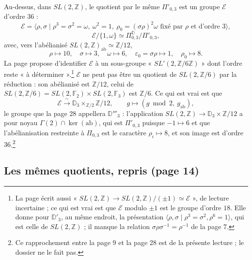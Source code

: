 \documentclass[11pt,a4paper]{article}
\begin{document}
Au-dessus, dans $SL(2, \mathbb{Z})$, le quotient par le même $\Pi'_{0,3}$ est un
groupe $\mathcal{E}$ d'ordre $36$ :
\[
\mathcal{E} = \langle \rho, \sigma \mid \rho^3 = \sigma^2 = \omega,\ \omega^2 = 1,\
\rho_0 = (\sigma\rho)^2\omega \text{ fixé par } \rho \text{ et d'ordre } 3 \rangle,
\]
\[
\mathcal{E}/\{1, \omega\} \simeq \Pi^{\mathbb{D}}_{0,3}/\Pi'_{0,3} ,
\]
avec, vers l'abélianisé $SL(2, \mathbb{Z})_{\mathrm{ab}} \simeq \mathbb{Z}/12$,
\[
\rho \mapsto 10, \quad \sigma \mapsto 3, \quad \omega \mapsto 6, \quad
\varepsilon_0 = \sigma\rho \mapsto 1, \quad \rho_0 \mapsto 8 .
\]
La page propose d'identifier $\mathcal{E}$ à un sous-groupe
« $SL'(2, \mathbb{Z}/6\mathbb{Z})$ » dont l'ordre reste « à
déterminer ».\footnote{La page écrit aussi
« $SL(2, \mathbb{Z}) \to SL(2, \mathbb{Z})/(\pm 1) \simeq \mathcal{E}$ », de
lecture incertaine ; ce qui est vrai est que $\mathcal{E}$ modulo $\pm 1$ est le
groupe d'ordre $18$. Elle donne pour $\mathbb{D}'_3$, au même endroit, la
présentation $\langle \rho, \sigma \mid \rho^3 = \sigma^2, \rho^6 = 1 \rangle$,
qui est celle de $SL(2, \mathbb{Z})$ ; il manque la relation
$\sigma\rho\sigma^{-1} = \rho^{-1}$ de la page 7.} $\mathcal{E}$ ne peut pas être
un quotient de $SL(2, \mathbb{Z}/6)$ par la réduction : son abélianisé est
$\mathbb{Z}/12$, celui de $SL(2, \mathbb{Z}/6) = SL(2, \mathbb{F}_2) \times
SL(2, \mathbb{F}_3)$ est $\mathbb{Z}/6$. Ce qui est vrai est que
\[
\mathcal{E} \xrightarrow{\ \sim\ } \mathbb{D}_3 \times_{\mathbb{Z}/2}
\mathbb{Z}/12, \qquad g \longmapsto (g \bmod 2,\ g_{\mathrm{ab}}) ,
\]
le groupe que la page 28 appellera $\mathbb{D}'''_3$ : l'application
$SL(2, \mathbb{Z}) \to \mathbb{D}_3 \times \mathbb{Z}/12$ a pour noyau
$\Gamma(2) \cap \ker(\mathrm{ab})$, qui est $\Pi'_{0,3}$ puisque $-1 \mapsto 6$
et que l'abélianisation restreinte à $\Pi_{0,3}$ est le caractère
$\rho_i \mapsto 8$, et son image est d'ordre $36$.\footnote{Ce rapprochement
entre la page 9 et la page 28 est de la présente lecture ; le dossier ne le fait
pas.}

\subsection*{Les mêmes quotients, repris (page 14)}
\end{document}
